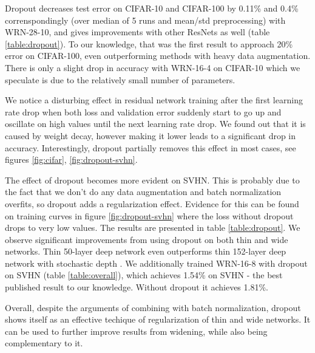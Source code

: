 \documentclass{bmvc2k}
\begin{document}
Dropout decreases test error on CIFAR-10 and CIFAR-100 by 0.11\% and 0.4\% correnspondingly (over median of 5 runs and mean/std preprocessing) with WRN-28-10, and gives improvements with other ResNets as well (table \ref{table:dropout}). To our knowledge, that was the first result to approach 20\% error on CIFAR-100, even outperforming methods with heavy data augmentation. There is only a slight drop in accuracy with WRN-16-4 on CIFAR-10 which we speculate is due to the relatively small number of parameters.

We notice a disturbing effect in residual network training after the first learning rate drop when both loss and validation error suddenly start to go up and oscillate on high values until the next learning rate drop. We found out that it is caused by weight decay, however making it lower leads to a significant drop in accuracy. Interestingly, dropout partially removes this effect in most cases, see figures \ref{fig:cifar}, \ref{fig:dropout-svhn}.

The effect of dropout becomes more evident on SVHN. This is probably due to the fact that we don't do any data augmentation and batch normalization overfits, so dropout adds a regularization effect. Evidence for this can be found on training curves in figure \ref{fig:dropout-svhn} where the loss without dropout drops to very low values. The results are presented in  table \ref{table:dropout}. We observe significant improvements from using dropout on both thin and wide networks. Thin 50-layer deep network even outperforms thin 152-layer deep network with stochastic depth \cite{stochastic_depth}. We additionally trained WRN-16-8 with dropout on SVHN (table \ref{table:overall}), which achieves 1.54\% on SVHN - the best published result to our knowledge. Without dropout it  achieves 1.81\%.

Overall, despite the arguments of combining with batch normalization, dropout shows itself as an effective techique of regularization of thin and wide networks. It can be used to further improve results from widening, while also being complementary to it.
\end{document}
